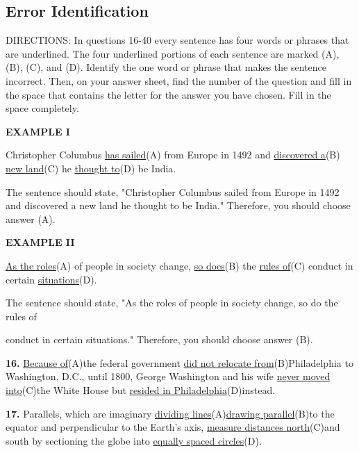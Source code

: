 \documentclass[12pt]{article}
\begin{document}
\subsection*{Error Identification}
DIRECTIONS: In questions 16-40 every sentence has four words or phrases that are underlined. The four underlined portions of each sentence are marked (A), (B), (C), and (D). Identify the one word or phrase that makes the sentence incorrect. Then, on your answer sheet, find the number of the question and fill in the space that contains the letter for the answer you have chosen. Fill in the space completely.\par
\begin{exampleblock}
\textbf{EXAMPLE I}\par
Christopher Columbus \uline{has sailed}(A) from Europe in 1492 and \uline{discovered a}(B) \uline{new land}(C) he \uline{thought to}(D) be India.\par
The sentence should state, "Christopher Columbus sailed from Europe in 1492 and discovered a new land he thought to be India." Therefore, you should choose answer (A).\par
\end{exampleblock}
\begin{exampleblock}
\textbf{EXAMPLE II}\par
\uline{As the roles}(A) of people in society change, \uline{so does}(B) the \uline{rules of}(C) conduct in certain \uline{situations}(D).\par
The sentence should state, "As the roles of people in society change, so do the rules of\par
conduct in certain situations." Therefore, you should choose answer (B).\par
\end{exampleblock}
\noindent\textbf{16.} \uline{Because of}(A)the federal government \uline{did not relocate from}(B)Philadelphia to Washington, D.C., until 1800, George Washington and his wife \uline{never moved into}(C)the White House but \uline{resided in Philadelphia}(D)instead.
\par
\vspace{\questionblockgap}
\noindent\textbf{17.} Parallels, which are imaginary \uline{dividing lines}(A)\uline{drawing parallel}(B)to the equator and perpendicular to the Earth's axis, \uline{measure distances north}(C)and south by sectioning the globe into \uline{equally spaced circles}(D).
\par
\vspace{\questionblockgap}
\end{document}
